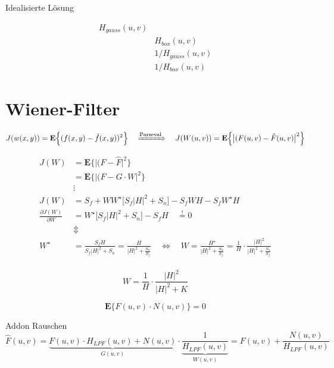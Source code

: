\documentclass{article}
\begin{document}
Idealisierte Lösung

\begin{align*}
    H_{gauss}(u,v) \\
    & H_{box}(u,v) \\
    & 1/H_{gauss}(u,v) \\
    & 1/H_{box}(u,v) 
\end{align*}


\newpage
\section{Wiener-Filter}

\begin{equation}
    J(w(x,y)) = \mathbf{E}\Big\{ (f(x,y) - \hat{f}(x,y))^2 \Big\} 
    \quad \xRightarrow{\text{Parseval}} \quad
    J(W(u,v)) = \mathbf{E}\Big\{ \big|(F(u,v) - \hat{F}(u,v)\big|^2 \Big\}  
\end{equation}
   

\begin{align*}
     J(W) &= \mathbf{E}\Big\{ \big|(F - \hat{F}\big|^2 \Big\} \\
     &= \mathbf{E}\Big\{ \big|(F -  G \cdot W \big|^2 \Big\} \\
     &\vdots \\
     J(W) &= S_f + W W^\star \Big[ S_f |H|^2 + S_n \Big] - S_f W H - S_f W^\star H \\
     \frac{\partial J(W)}{\partial W} &= W^\star  \Big[ S_f |H|^2 + S_n \Big] - S_f H \quad \stackrel{!}{=} 0 \\
     &\Updownarrow \\
     W^\star &= \frac{S_f H}{S_f |H|^2 + S_n} = \frac{H}{|H|^2 + \frac{S_n}{S_f}} 
     \quad \Leftrightarrow \quad
     W = \frac{H^\star}{|H|^2 + \frac{S_n}{S_f}} = 
     \frac{1}{H} \cdot \frac{|H|^2}{|H|^2 + \frac{S_n}{S_f}}\\
\end{align*}

\begin{equation}
     W = \frac{1}{H} \cdot \frac{|H|^2}{|H|^2 + K}
\end{equation}


\begin{equation}
    \mathbf{E}\Big\{
        F(u,v) \cdot N(u,v)
    \Big\}  = 0
\end{equation}


Addon Rauschen
\begin{equation}
    \hat{F}(u,v) = \underbrace{F(u,v)\cdot H_{LPF}(u,v) + N(u,v)}_{G(u,v)} \cdot \underbrace{\frac{1}{H_{LPF}(u,v)}}_{W(u,v)} = F(u,v) + \frac{N(u,v)}{H_{LPF}(u,v)}
\end{equation}
\end{document}
